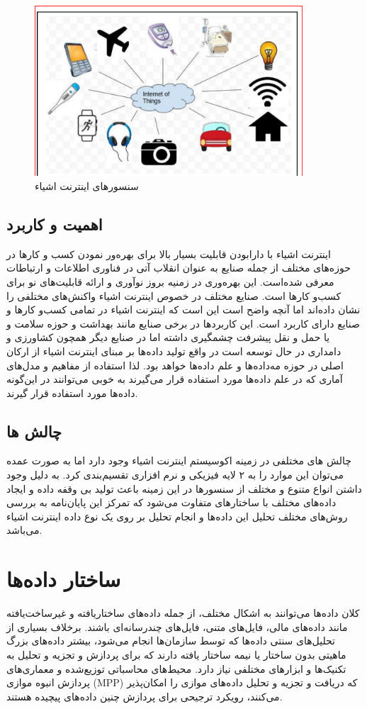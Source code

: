  \begin{figure}[H]
	\centering
	\includegraphics[width=10cm]{iot_sensors.png}
	\caption{سنسورهای اینترنت اشیاء}
\end{figure}


\subsection{اهمیت و کاربرد}
اینترنت اشیاء با دارابودن قابلیت بسیار بالا برای بهره‌ور نمودن کسب و کارها در حوزه‌های مختلف از جمله صنایع به عنوان انقلاب آتی در فناوری اطلاعات و ارتباطات معرفی شده‌است. این بهره‌وری در زمنیه بروز نوآوری و ارائه قابلیت‌های نو برای کسب‌و کارها است. صنایع مختلف در خصوص اینترنت اشیاء واکنش‌های مختلفی را نشان داده‌اند اما آنچه واضح است این است که اینترنت اشیاء در تمامی کسب‌و کارها و صنایع دارای کاربرد است. این کاربردها در برخی صنایع مانند بهداشت و حوزه سلامت و یا حمل و نقل پیشرفت چشمگیری داشته اما در صنایع دیگر همچون کشاورزی و دامداری در حال توسعه است در واقع تولید داده‌ها بر مبنای اینترنت اشیاء از ارکان اصلی در حوزه مه‌داده‌ها و علم داده‌ها خواهد بود. لذا استفاده از مفاهیم و مدل‌های آماری که در علم داده‌ها مورد استفاده قرار می‌گیرند به خوبی می‌توانند در این‌گونه داده‌ها مورد استفاده قرار گیرند.
\subsection{چالش ها}
چالش های مختلفی در زمینه اکوسیستم اینترنت اشیاء وجود دارد اما به صورت عمده می‌توان این موارد را به ۲ لایه فیزیکی و نرم افزاری تقسیم‌بندی کرد. به دلیل وجود داشتن انواع متنوع و مختلف از سنسورها در این زمینه باعث تولید بی وقفه داده و ایجاد داده‌های مختلف با ساختار‌های متفاوت می‌شود که تمرکز این پایان‌نامه به بررسی روش‌های مختلف تحلیل این‌ داده‌ها و انجام تحلیل بر روی یک نوع داده اینترنت اشیاء می‌باشد.
 
\section{ساختار داده‌ها}
کلان داده‌ها می‌توانند به اشکال مختلف، از جمله داده‌های ساختاریافته و غیرساخت‌یافته مانند داده‌های مالی، فایل‌های متنی، فایل‌های چندرسانه‌ای باشند. برخلاف بسیاری از تحلیل‌های سنتی داده‌ها که توسط سازمان‌ها انجام می‌شود، بیشتر داده‌های بزرگ ماهیتی بدون ساختار یا نیمه ساختار یافته دارند که برای پردازش و تجزیه و تحلیل به تکنیک‌ها و ابزارهای مختلفی نیاز دارد. محیط‌های محاسباتی توزیع‌شده و معماری‌های پردازش انبوه موازی (MPP) که دریافت و تجزیه و تحلیل داده‌های موازی را امکان‌پذیر می‌کنند، رویکرد ترجیحی برای پردازش چنین داده‌های پیچیده هستند.

